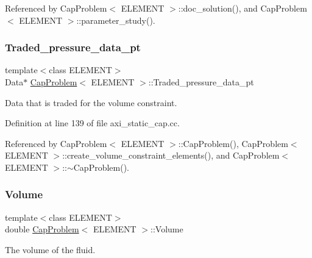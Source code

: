 Referenced by Cap\+Problem$<$ E\+L\+E\+M\+E\+N\+T $>$\+::doc\+\_\+solution(), and Cap\+Problem$<$ E\+L\+E\+M\+E\+N\+T $>$\+::parameter\+\_\+study().

\mbox{\label{classCapProblem_a1ef465adfeb4804ba6e1cd3881c8277b}} 
\subsubsection{\texorpdfstring{Traded\+\_\+pressure\+\_\+data\+\_\+pt}{Traded\_pressure\_data\_pt}}
{\footnotesize\ttfamily template$<$class E\+L\+E\+M\+E\+NT$>$ \\
Data$\ast$ \hyperlink{classCapProblem}{Cap\+Problem}$<$ E\+L\+E\+M\+E\+NT $>$\+::Traded\+\_\+pressure\+\_\+data\+\_\+pt\hspace{0.3cm}{\ttfamily [private]}}



Data that is traded for the volume constraint. 



Definition at line 139 of file axi\+\_\+static\+\_\+cap.\+cc.



Referenced by Cap\+Problem$<$ E\+L\+E\+M\+E\+N\+T $>$\+::\+Cap\+Problem(), Cap\+Problem$<$ E\+L\+E\+M\+E\+N\+T $>$\+::create\+\_\+volume\+\_\+constraint\+\_\+elements(), and Cap\+Problem$<$ E\+L\+E\+M\+E\+N\+T $>$\+::$\sim$\+Cap\+Problem().

\mbox{\label{classCapProblem_ab1f403fd3be7648c3a52a66684a78f7e}} 
\subsubsection{\texorpdfstring{Volume}{Volume}}
{\footnotesize\ttfamily template$<$class E\+L\+E\+M\+E\+NT$>$ \\
double \hyperlink{classCapProblem}{Cap\+Problem}$<$ E\+L\+E\+M\+E\+NT $>$\+::Volume\hspace{0.3cm}{\ttfamily [private]}}



The volume of the fluid. 



